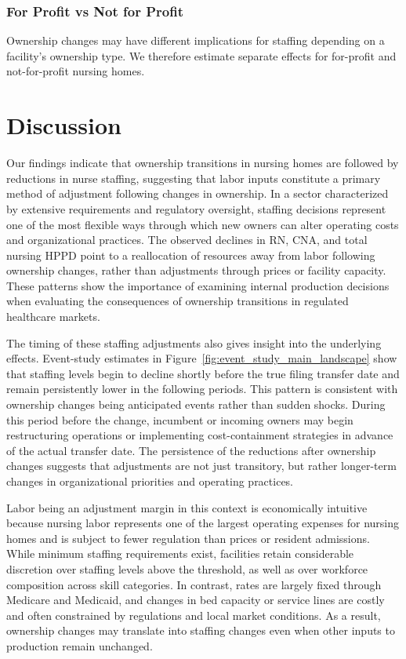 \documentclass[preprint,authoryear]{elsarticle}
\begin{document}
\subsubsection{For Profit vs Not for Profit}

Ownership changes may have different implications for staffing depending on a facility's ownership type. We therefore estimate separate effects for for-profit and not-for-profit nursing homes.

\section{Discussion}

Our findings indicate that ownership transitions in nursing homes are followed by reductions in nurse staffing, suggesting that labor inputs constitute a primary method of adjustment following changes in ownership. In a sector characterized by extensive requirements and regulatory oversight, staffing decisions represent one of the most flexible ways through which new owners can alter operating costs and organizational practices. The observed declines in RN, CNA, and total nursing HPPD point to a reallocation of resources away from labor following ownership changes, rather than adjustments through prices or facility capacity. These patterns show the importance of examining internal production decisions when evaluating the consequences of ownership transitions in regulated healthcare markets.

The timing of these staffing adjustments also gives insight into the underlying effects. Event-study estimates in Figure~\ref{fig:event_study_main_landscape} show that staffing levels begin to decline shortly before the true filing transfer date and remain persistently lower in the following periods. This pattern is consistent with ownership changes being anticipated events rather than sudden shocks. During this period before the change, incumbent or incoming owners may begin restructuring operations or implementing cost-containment strategies in advance of the actual transfer date. The persistence of the reductions after ownership changes suggests that adjustments are not just transitory, but rather longer-term changes in organizational priorities and operating practices.

Labor being an adjustment margin in this context is economically intuitive because nursing labor represents one of the largest operating expenses for nursing homes and is subject to fewer regulation than prices or resident admissions. While minimum staffing requirements exist, facilities retain considerable discretion over staffing levels above the threshold, as well as over workforce composition across skill categories. In contrast, rates are largely fixed through Medicare and Medicaid, and changes in bed capacity or service lines are costly and often constrained by regulations and local market conditions. As a result, ownership changes may translate into staffing changes even when other inputs to production remain unchanged.
\end{document}
